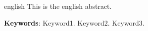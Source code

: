 \begin{resumo}[Abstract]
\begin{otherlanguage*}{english}
This is the english abstract.

\vspace{\onelineskip}

\noindent 
\textbf{Keywords}: Keyword1. Keyword2. Keyword3.
\end{otherlanguage*}
\end{resumo}